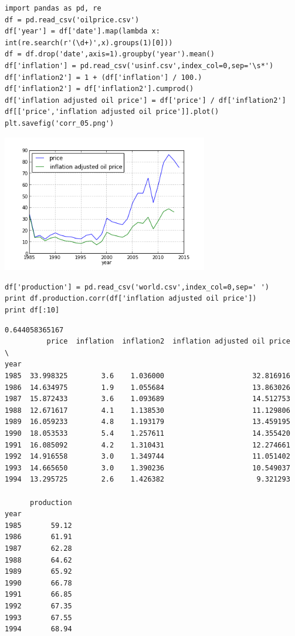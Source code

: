 \documentclass[12pt,fleqn]{article}\usepackage{../common}
\begin{document}
\begin{verbatim}
import pandas as pd, re
df = pd.read_csv('oilprice.csv')
df['year'] = df['date'].map(lambda x: int(re.search(r'(\d+)',x).groups(1)[0]))
df = df.drop('date',axis=1).groupby('year').mean()
df['inflation'] = pd.read_csv('usinf.csv',index_col=0,sep='\s*')
df['inflation2'] = 1 + (df['inflation'] / 100.)
df['inflation2'] = df['inflation2'].cumprod()
df['inflation adjusted oil price'] = df['price'] / df['inflation2']
df[['price','inflation adjusted oil price']].plot()
plt.savefig('corr_05.png')
\end{verbatim}

\includegraphics[height=6cm]{corr_05.png}


\begin{verbatim}
df['production'] = pd.read_csv('world.csv',index_col=0,sep=' ')
print df.production.corr(df['inflation adjusted oil price'])
print df[:10]
\end{verbatim}

\begin{verbatim}
0.644058365167
          price  inflation  inflation2  inflation adjusted oil price  \
year                                                                   
1985  33.998325        3.6    1.036000                     32.816916   
1986  14.634975        1.9    1.055684                     13.863026   
1987  15.872433        3.6    1.093689                     14.512753   
1988  12.671617        4.1    1.138530                     11.129806   
1989  16.059233        4.8    1.193179                     13.459195   
1990  18.053533        5.4    1.257611                     14.355420   
1991  16.085092        4.2    1.310431                     12.274661   
1992  14.916558        3.0    1.349744                     11.051402   
1993  14.665650        3.0    1.390236                     10.549037   
1994  13.295725        2.6    1.426382                      9.321293   

      production  
year              
1985       59.12  
1986       61.91  
1987       62.28  
1988       64.62  
1989       65.92  
1990       66.78  
1991       66.85  
1992       67.35  
1993       67.55  
1994       68.94  
\end{verbatim}
\end{document}
